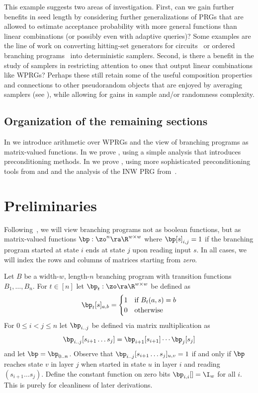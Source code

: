 \documentclass{toc}
\begin{document}
This example suggests two areas of investigation.  First, can we gain further benefits in seed length by considering further generalizations of PRGs that are allowed to estimate acceptance probability with more general functions than linear combinations (or possibly even with adaptive queries)?  Some examples are the
line of work on converting hitting-set generators for circuits~\cite{AndreevClRo98,AndreevClRoTr99,BuhrmanFo99,GoldreichVaWi11} or ordered branching programs~\cite{ChengHo20} into deterministic samplers.
Second, is there a benefit in the study of samplers in restricting attention to ones that output linear combinations like WPRGs?  Perhaps these still %
retain  %
some of the useful composition properties and connections to other pseudorandom objects that are enjoyed by averaging samplers %
(see  %
\cite{Zuckerman97,vadhan2012pseudorandomness,Agrawal19}), while allowing for gains in sample and/or randomness complexity.

\subsection{Organization of the remaining sections}
In  we introduce arithmetic over WPRGs and the view of branching programs as %
matrix-valued  %
functions. In  we prove , using a simple analysis that introduces preconditioning methods. In  we prove , using more sophisticated preconditioning tools from \cite{AhmadinejadKeMuPeSiVa19} and \cite{CKPPRSV17} and the analysis of the INW PRG from~\cite{HozaPyVa21}.

\section{Preliminaries}\label{sec:prelim}
Following~\cite{ReingoldStVa13}, we will view branching programs not as boolean functions, but as matrix-valued functions $\bp:\zo^n\ra\R^{w\times w}$ where $\bp[s]_{i,j}=1$ if the branching program started at state $i$ ends at state $j$ upon reading input $s$. In all cases, we will index the rows and columns of matrices starting from \emph{zero}.

\begin{definition}
Let $B$ be a width-$w$, length-$n$ branching program with transition functions $B_1,\ldots,B_n$. For $t\in [n]$ let $\bp_t:\zo\ra \R^{w\times w}$ be defined as
\[\bp_t[s]_{a,b} = \begin{cases}   
1 & \text{if } B_t(a,s)=b\\
0 & \text{otherwise}
\end{cases}\]
For $0\leq i<j\leq n$ let $\bp_{i..j}$ be defined via matrix multiplication as 
\[\bp_{i..j}[s_{i+1}\dots s_{j}]=\bp_{i+1}[s_{i+1}]\cdots\bp_j[s_j]\]
and let $\bp=\bp_{0..n}$. Observe that $\bp_{i..j}[s_{i+1}\dots s_j]_{u,v}=1$ if and only if $\bp$ reaches state $v$ in layer $j$ when started in state $u$ in layer $i$ and reading $(s_{i+1}\dots s_j)$. Define the constant function on zero bits $\bp_{i,i}[]=\I_w$ for all $i$. This is purely for cleanliness of later derivations.
\end{definition}
\end{document}
